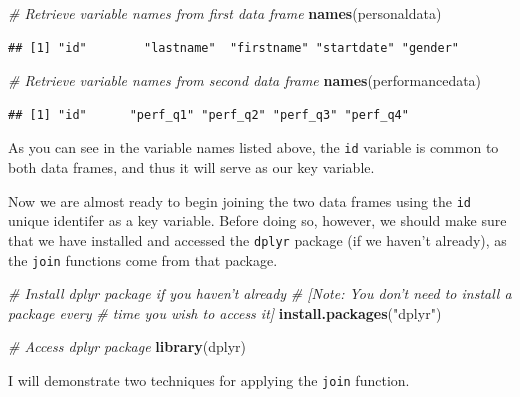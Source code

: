 \documentclass[]{book}
\newenvironment{Shaded}{\begin{snugshade}}{\end{snugshade}}
\newcommand{\KeywordTok}[1]{\textcolor[rgb]{0.13,0.29,0.53}{\textbf{#1}}}
\newcommand{\StringTok}[1]{\textcolor[rgb]{0.31,0.60,0.02}{#1}}
\newcommand{\CommentTok}[1]{\textcolor[rgb]{0.56,0.35,0.01}{\textit{#1}}}
\newcommand{\NormalTok}[1]{#1}
\begin{document}
\begin{Shaded}
\begin{Highlighting}[]
\CommentTok{# Retrieve variable names from first data frame}
\KeywordTok{names}\NormalTok{(personaldata)}
\end{Highlighting}
\end{Shaded}

\begin{verbatim}
## [1] "id"        "lastname"  "firstname" "startdate" "gender"
\end{verbatim}

\begin{Shaded}
\begin{Highlighting}[]
\CommentTok{# Retrieve variable names from second data frame}
\KeywordTok{names}\NormalTok{(performancedata)}
\end{Highlighting}
\end{Shaded}

\begin{verbatim}
## [1] "id"      "perf_q1" "perf_q2" "perf_q3" "perf_q4"
\end{verbatim}

As you can see in the variable names listed above, the \texttt{id}
variable is common to both data frames, and thus it will serve as our
key variable.

Now we are almost ready to begin joining the two data frames using the
\texttt{id} unique identifer as a key variable. Before doing so,
however, we should make sure that we have installed and accessed the
\texttt{dplyr} package (if we haven't already), as the \texttt{join}
functions come from that package.

\begin{Shaded}
\begin{Highlighting}[]
\CommentTok{# Install dplyr package if you haven't already}
\CommentTok{# [Note: You don't need to install a package every }
\CommentTok{# time you wish to access it]}
\KeywordTok{install.packages}\NormalTok{(}\StringTok{"dplyr"}\NormalTok{)}
\end{Highlighting}
\end{Shaded}

\begin{Shaded}
\begin{Highlighting}[]
\CommentTok{# Access dplyr package}
\KeywordTok{library}\NormalTok{(dplyr)}
\end{Highlighting}
\end{Shaded}

I will demonstrate two techniques for applying the \texttt{join}
function.
\end{document}
